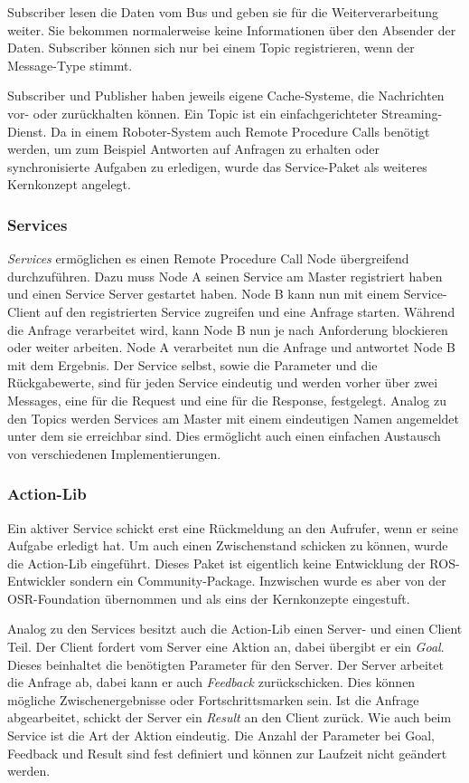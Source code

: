 Subscriber lesen die Daten vom Bus und geben sie für die Weiterverarbeitung weiter. Sie bekommen normalerweise keine Informationen über den Absender der Daten. Subscriber können sich nur bei einem Topic registrieren, wenn der Message-Type stimmt.

Subscriber und Publisher haben jeweils eigene Cache-Systeme, die Nachrichten vor- oder zurückhalten können. Ein Topic ist ein einfachgerichteter Streaming-Dienst. Da in einem Roboter-System auch Remote Procedure Calls benötigt werden, um zum Beispiel Antworten auf Anfragen zu erhalten oder synchronisierte Aufgaben zu erledigen, wurde das Service-Paket als weiteres Kernkonzept angelegt.

\subsubsection{Services}

\textit{Services} ermöglichen es einen Remote Procedure Call Node übergreifend durchzuführen. Dazu muss Node A seinen Service am Master registriert haben und einen Service Server gestartet haben. Node B kann nun mit einem Service-Client auf den registrierten Service zugreifen und eine Anfrage starten. Während die Anfrage verarbeitet wird, kann Node B nun je nach Anforderung blockieren oder weiter arbeiten. Node A verarbeitet nun die Anfrage und antwortet Node B mit dem Ergebnis. Der Service selbst, sowie die Parameter und die Rückgabewerte, sind für jeden Service eindeutig und werden vorher über zwei Messages, eine für die Request und eine für die Response, festgelegt. Analog zu den Topics werden Services am Master mit einem eindeutigen Namen angemeldet unter dem sie erreichbar sind. Dies ermöglicht auch einen einfachen Austausch von verschiedenen Implementierungen.

\subsubsection{Action-Lib}
\label{sec:basic-ros-action}
Ein aktiver Service schickt erst eine Rückmeldung an den Aufrufer, wenn er seine Aufgabe erledigt hat. Um auch einen Zwischenstand schicken zu können, wurde die Action-Lib eingeführt. Dieses Paket ist eigentlich keine Entwicklung der ROS-Entwickler sondern ein Community-Package. Inzwischen wurde es aber von der OSR-Foundation übernommen und als eins der Kernkonzepte eingestuft.

Analog zu den Services besitzt auch die Action-Lib einen Server- und einen Client Teil. Der Client fordert vom Server eine Aktion an, dabei übergibt er ein \textit{Goal}. Dieses beinhaltet die benötigten Parameter für den Server. Der Server arbeitet die Anfrage ab, dabei kann er auch \textit{Feedback} zurückschicken. Dies können mögliche Zwischenergebnisse oder Fortschrittsmarken sein. Ist die Anfrage abgearbeitet, schickt der Server ein \textit{Result} an den Client zurück. Wie auch beim Service ist die Art der Aktion eindeutig. Die Anzahl der Parameter bei Goal, Feedback und Result sind fest definiert und können zur Laufzeit nicht geändert werden.